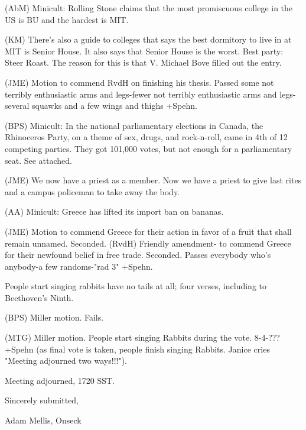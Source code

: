 \documentclass[12pt]{article}
\begin{document}
(AbM) Minicult: Rolling Stone claims that the most promiscuous college in the US is BU and the hardest is MIT.

(KM) There's also a guide to colleges that says the best dormitory to live in at MIT is Senior House. It also says that Senior House is the worst. Best party: Steer Roast. The reason for this is that V. Michael Bove filled out the entry.

(JME) Motion to commend RvdH on finishing his thesis. Passed some not terribly enthusiastic arms and legs-fewer not terribly enthusiastic arms and legs-several squawks and a few wings and thighs +Spehn.

(BPS) Minicult: In the national parliamentary elections in Canada, the Rhinoceros Party, on a theme of sex, drugs, and rock-n-roll, came in 4th of 12 competing parties. They got 101,000 votes, but not enough for a parliamentary seat. See attached.

(JME) We now have a priest as a member. Now we have a priest to give last rites and a campus policeman to take away the body.

(AA) Minicult: Greece has lifted its import ban on bananas.

(JME) Motion to commend Greece for their action in favor of a fruit that shall remain unnamed. Seconded. (RvdH) Friendly amendment- to commend Greece for their newfound belief in free trade. Seconded. Passes everybody who's anybody-a few randoms-"rad 3" +Spehn.

People start singing rabbits have no tails at all; four verses, including to Beethoven's Ninth.

(BPS) Miller motion. Fails.

(MTG) Miller motion. People start singing Rabbits during the vote. 8-4-??? +Spehn (as final vote is taken, people finish singing Rabbits. Janice cries "Meeting adjourned two ways!!!").

\vspace{12pt}

\noindent
Meeting adjourned, 1720 SST.

\vspace{18pt}

\centerline{Sincerely submitted,}
\centerline{Adam Mellis, Onseck}
\end{document}
